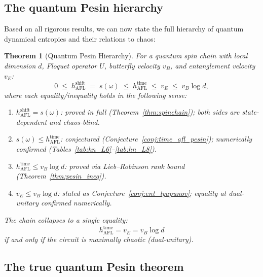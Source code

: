\documentclass[12pt,a4paper]{article}
\newtheorem{theorem}{Theorem}[section]
\begin{document}
\subsection{The quantum Pesin hierarchy}

Based on all rigorous results, we can now state the full hierarchy of
quantum dynamical entropies and their relations to chaos:

\begin{theorem}[Quantum Pesin Hierarchy]
\label{thm:pesin_hierarchy}
For a quantum spin chain with local dimension $d$, Floquet operator $U$,
butterfly velocity $v_B$, and entanglement velocity $v_E$:
\begin{equation}\label{eq:hierarchy}
  0 \;\leq\; h_{\mathrm{AFL}}^{\mathrm{shift}}
  \;=\; s(\omega)
  \;\leq\; h_{\mathrm{AFL}}^{\mathrm{time}}
  \;\leq\; v_E
  \;\leq\; v_B\log d,
\end{equation}
where each equality/inequality holds in the following sense:
\begin{enumerate}
\item $h_{\mathrm{AFL}}^{\mathrm{shift}} = s(\omega)$: proved in full
  (Theorem~\ref{thm:spinchain}); both sides are
  \emph{state-dependent} and chaos-blind.
\item $s(\omega)\leq h_{\mathrm{AFL}}^{\mathrm{time}}$: conjectured
  (Conjecture~\ref{conj:time_afl_pesin}); numerically confirmed
  (Tables~\ref{tab:hn_L6}--\ref{tab:hn_L8}).
\item $h_{\mathrm{AFL}}^{\mathrm{time}}\leq v_B\log d$: proved via
  Lieb--Robinson rank bound (Theorem~\ref{thm:pesin_ineq}).
\item $v_E\leq v_B\log d$: stated as Conjecture~\ref{conj:ent_lyapunov};
  equality at dual-unitary confirmed numerically.
\end{enumerate}
The chain collapses to a single equality:
\[
  h_{\mathrm{AFL}}^{\mathrm{time}}
  = v_E = v_B\log d
\]
if and only if the circuit is \emph{maximally chaotic} (dual-unitary).
\end{theorem}

\subsection{The true quantum Pesin theorem}
\end{document}
